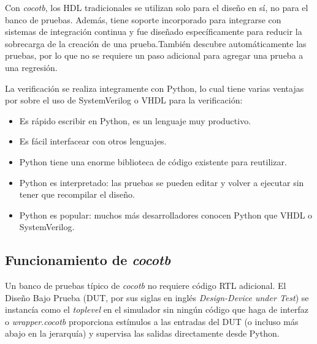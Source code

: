  Con \textit{cocotb}, los HDL tradicionales se utilizan solo para el diseño en
  sí, no para el banco de pruebas. Además, tiene soporte incorporado para
  integrarse con sistemas de integración continua y fue diseñado específicamente
  para reducir la sobrecarga de la creación de una prueba.También descubre
  automáticamente las pruebas, por lo que no se requiere un paso adicional para
  agregar una prueba a una regresión.

  La verificación se realiza integramente con Python, lo cual tiene varias
  ventajas por sobre el uso de SystemVerilog o VHDL para la verificación:

\begin{itemize}
  \item Es rápido escribir en Python, es un lenguaje muy productivo.
  \item Es fácil interfacear con otros lenguajes.
  \item Python tiene una enorme biblioteca de código existente para reutilizar.
  \item Python es interpretado: las pruebas se pueden editar y volver a ejecutar
  sin tener que recompilar el diseño.
  \item Python es popular: muchos más desarrolladores conocen Python que
  VHDL o SystemVerilog.
\end{itemize}

\subsection{Funcionamiento de \textit{cocotb}}

  Un banco de pruebas típico de \textit{cocotb} no requiere código RTL adicional.
  El Diseño Bajo Prueba (DUT, por sus siglas en inglés \textit{Design-Device
  under Test}) se instancía como el \textit{toplevel} en el simulador sin ningún
  código que haga de interfaz o \textit{wrapper}.\textit{cocotb} proporciona
  estímulos a las entradas del DUT (o incluso más abajo en la jerarquía) y
  supervisa las salidas directamente desde Python.




